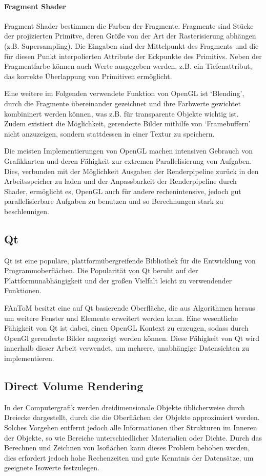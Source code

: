 \documentclass[a4paper,fontsize=12pt,toc=bib,halfparskip]{scrartcl}
\begin{document}
\paragraph{Fragment Shader}
Fragment Shader bestimmen die Farben der Fragmente. Fragmente sind St\"ucke der projizierten Primitve, deren Gr\"o{\ss}e von der Art der Rasterisierung abh\"angen (z.B. Supersampling). Die Eingaben sind der Mittelpunkt des Fragments und die f\"ur diesen Punkt interpolierten Attribute der Eckpunkte des Primitivs. Neben der Fragmentfarbe k\"onnen auch Werte ausgegeben werden, z.B. ein Tiefenattribut, das korrekte \"Uberlappung von Primitiven erm\"oglicht.

Eine weitere im Folgenden verwendete Funktion von OpenGL ist `Blending', durch die Fragmente \"ubereinander gezeichnet und ihre Farbwerte gewichtet kombininert werden k\"onnen, was z.B. f\"ur transparente Objekte wichtig ist. Zudem existiert die M\"oglichkeit, gerenderte Bilder mithilfe von `Framebuffern' nicht anzuzeigen, sondern stattdessen in einer Textur zu speichern.

Die meisten Implementierungen von OpenGL machen intensiven Gebrauch von Grafikkarten und deren F\"ahigkeit zur extremen Parallelisierung von Aufgaben. Dies, verbunden mit der M\"oglichkeit Ausgaben der Renderpipeline zur\"uck in den Arbeitsspeicher zu laden und der Anpassbarkeit der Renderpipeline durch Shader, erm\"oglicht es, OpenGL auch f\"ur andere rechenintensive, jedoch gut parallelisierbare Aufgaben zu benutzen und so Berechnungen stark zu beschleunigen.

\subsection{Qt}
Qt\cite{qtWebsite} ist eine popul\"are, plattform\"ubergreifende Bibliothek f\"ur die Entwicklung von Programmoberfl\"achen. Die Popularit\"at von Qt beruht auf der Plattformunabh\"angigkeit und der gro{\ss}en Vielfalt leicht zu verwendender Funktionen.

FAnToM besitzt eine auf Qt basierende Oberfl\"ache, die aus Algorithmen heraus um weitere Fenster und Elemente erweitert werden kann. Eine wesentliche F\"ahigkeit von Qt ist dabei, einen OpenGL Kontext zu erzeugen, sodass durch OpenGl gerenderte Bilder angezeigt werden k\"onnen. Diese F\"ahigkeit von Qt wird innerhalb dieser Arbeit verwendet, um mehrere, unabh\"angige Datensichten zu implementieren.

\subsection{Direct Volume Rendering}
In der Computergrafik werden dreidimensionale Objekte \"ublicherweise durch Dreiecke dargestellt, durch die die Oberfl\"achen der Objekte approximiert werden. Solches Vorgehen entfernt jedoch alle Informationen \"uber Strukturen im Inneren der Objekte, so wie Bereiche unterschiedlicher Materialien oder Dichte. Durch das Berechnen und Zeichnen von Isofl\"achen kann dieses Problem behoben werden, dies erfordert jedoch hohe Rechenzeiten und gute Kenntnis der Datens\"atze, um geeignete Isowerte festzulegen.
\end{document}
